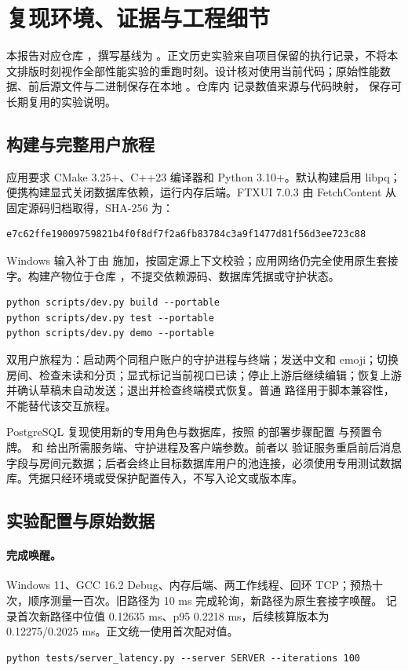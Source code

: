 \section{复现环境、证据与工程细节}
\label{app:repro}
本报告对应仓库 ，撰写基线为 。正文历史实验来自项目保留的执行记录，不将本文排版时刻视作全部性能实验的重跑时刻。设计核对使用当前代码；原始性能数据、前后源文件与二进制保存在本地 。仓库内  记录数值来源与代码映射， 保存可长期复用的实验说明。

\subsection{构建与完整用户旅程}
应用要求 CMake 3.25+、C++23 编译器和 Python 3.10+。默认构建启用 libpq；便携构建显式关闭数据库依赖，运行内存后端。FTXUI 7.0.3 由 FetchContent 从固定源码归档取得，SHA-256 为：
\begin{lstlisting}
e7c62ffe19009759821b4f0f8df7f2a6fb83784c3a9f1477d81f56d3ee723c88
\end{lstlisting}
Windows 输入补丁由  施加，按固定源上下文校验；应用网络仍完全使用原生套接字。构建产物位于仓库 ，不提交依赖源码、数据库凭据或守护状态。
\begin{lstlisting}[language={}]
python scripts/dev.py build --portable
python scripts/dev.py test --portable
python scripts/dev.py demo --portable
\end{lstlisting}
双用户旅程为：启动两个同租户账户的守护进程与终端；发送中文和 emoji；切换房间、检查未读和分页；显式标记当前视口已读；停止上游后继续编辑；恢复上游并确认草稿未自动发送；退出并检查终端模式恢复。普通  路径用于脚本兼容性，不能替代该交互旅程。

PostgreSQL 复现使用新的专用角色与数据库，按照  的部署步骤配置  与预置令牌。 和  给出所需服务端、守护进程及客户端参数。前者以  验证服务重启前后消息字段与房间元数据；后者会终止目标数据库用户的池连接，必须使用专用测试数据库。凭据只经环境或受保护配置传入，不写入论文或版本库。

\subsection{实验配置与原始数据}
\paragraph{完成唤醒。}
Windows 11、GCC 16.2 Debug、内存后端、两工作线程、回环 TCP；预热十次，顺序测量一百次。旧路径为 10 ms 完成轮询，新路径为原生套接字唤醒。 记录首次新路径中位值 0.12635 ms、p95 0.2218 ms，后续核算版本为 0.12275/0.2025 ms。正文统一使用首次配对值。
\begin{lstlisting}
python tests/server_latency.py --server SERVER --iterations 100
\end{lstlisting}

